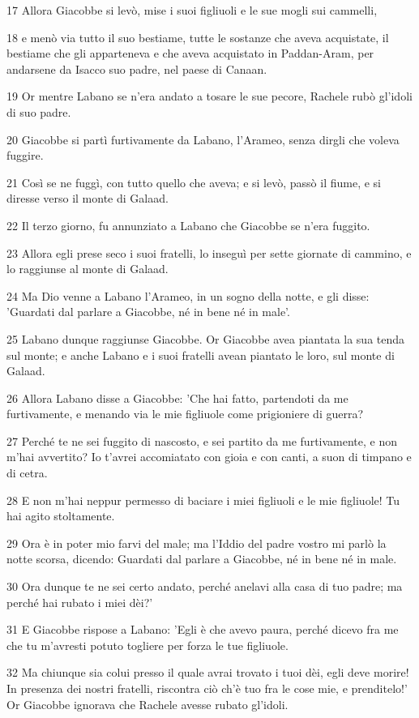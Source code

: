 \par 17 Allora Giacobbe si levò, mise i suoi figliuoli e le sue mogli sui cammelli,
\par 18 e menò via tutto il suo bestiame, tutte le sostanze che aveva acquistate, il bestiame che gli apparteneva e che aveva acquistato in Paddan-Aram, per andarsene da Isacco suo padre, nel paese di Canaan.
\par 19 Or mentre Labano se n'era andato a tosare le sue pecore, Rachele rubò gl'idoli di suo padre.
\par 20 Giacobbe si partì furtivamente da Labano, l'Arameo, senza dirgli che voleva fuggire.
\par 21 Così se ne fuggì, con tutto quello che aveva; e si levò, passò il fiume, e si diresse verso il monte di Galaad.
\par 22 Il terzo giorno, fu annunziato a Labano che Giacobbe se n'era fuggito.
\par 23 Allora egli prese seco i suoi fratelli, lo inseguì per sette giornate di cammino, e lo raggiunse al monte di Galaad.
\par 24 Ma Dio venne a Labano l'Arameo, in un sogno della notte, e gli disse: 'Guardati dal parlare a Giacobbe, né in bene né in male'.
\par 25 Labano dunque raggiunse Giacobbe. Or Giacobbe avea piantata la sua tenda sul monte; e anche Labano e i suoi fratelli avean piantato le loro, sul monte di Galaad.
\par 26 Allora Labano disse a Giacobbe: 'Che hai fatto, partendoti da me furtivamente, e menando via le mie figliuole come prigioniere di guerra?
\par 27 Perché te ne sei fuggito di nascosto, e sei partito da me furtivamente, e non m'hai avvertito? Io t'avrei accomiatato con gioia e con canti, a suon di timpano e di cetra.
\par 28 E non m'hai neppur permesso di baciare i miei figliuoli e le mie figliuole! Tu hai agito stoltamente.
\par 29 Ora è in poter mio farvi del male; ma l'Iddio del padre vostro mi parlò la notte scorsa, dicendo: Guardati dal parlare a Giacobbe, né in bene né in male.
\par 30 Ora dunque te ne sei certo andato, perché anelavi alla casa di tuo padre; ma perché hai rubato i miei dèi?'
\par 31 E Giacobbe rispose a Labano: 'Egli è che avevo paura, perché dicevo fra me che tu m'avresti potuto togliere per forza le tue figliuole.
\par 32 Ma chiunque sia colui presso il quale avrai trovato i tuoi dèi, egli deve morire! In presenza dei nostri fratelli, riscontra ciò ch'è tuo fra le cose mie, e prenditelo!' Or Giacobbe ignorava che Rachele avesse rubato gl'idoli.
